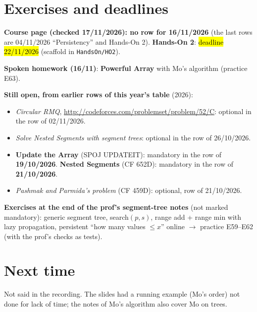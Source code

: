 \documentclass[11pt,a4paper]{article}
\theoremstyle{definition}\newtheorem*{definition}{Definition}
\newcommand{\hlp}[1]{{\sethlcolor{hlP}\hl{#1}}}
\begin{document}
\section{Exercises and deadlines}\label{sec:ex}
\begin{keybox}
\textbf{Course page (checked 17/11/2026): no row for 16/11/2026} (the last rows are 04/11/2026 ``Persistency'' and Hands-On 2). \textbf{Hands-On 2}: \hlp{deadline 22/11/2026} (scaffold in \texttt{HandsOn/HO2}).

\smallskip
\textbf{Spoken homework (16/11)}: \textbf{Powerful Array} with Mo's algorithm (practice E63).

\smallskip
\textbf{Still open, from earlier rows of this year's table} (2026):
\begin{itemize}[nosep]
\item \emph{Circular RMQ}, \url{http://codeforces.com/problemset/problem/52/C}: optional in the row of 02/11/2026.
\item \emph{Solve Nested Segments with segment trees}: optional in the row of 26/10/2026.
\item \textbf{Update the Array} (SPOJ UPDATEIT): mandatory in the row of \textbf{19/10/2026}. \textbf{Nested Segments} (CF 652D): mandatory in the row of \textbf{21/10/2026}.
\item \emph{Pashmak and Parmida's problem} (CF 459D): optional, row of 21/10/2026.
\end{itemize}

\smallskip
\textbf{Exercises at the end of the prof's segment-tree notes} (not marked mandatory): generic segment tree, \textsf{search}$(p,s)$, range add + range min with lazy propagation,
persistent ``how many values $\le x$'' online $\to$ practice E59--E62 (with the prof's checks as tests).
\end{keybox}

\section{Next time}
Not said in the recording. The slides had a running example (Mo's order) not done for lack of time; the notes of Mo's algorithm also cover Mo on trees.
\end{document}
